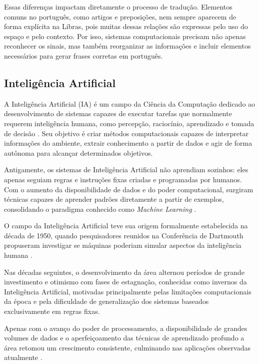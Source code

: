 \documentclass[
    12pt,                %
    openright,           %
    oneside,             %
    a4paper,             %
    english,             %
    brazil               %
]{abntex2}
\begin{document}
Essas diferenças impactam diretamente o processo de tradução. Elementos comuns no português, como artigos e preposições, nem sempre aparecem de forma explícita na Libras, pois muitas dessas relações são expressas pelo uso do espaço e pelo contexto. Por isso, sistemas computacionais precisam não apenas reconhecer os sinais, mas também reorganizar as informações e incluir elementos necessários para gerar frases corretas em português.


\subsection{Inteligência Artificial}

A Inteligência Artificial (IA) é um campo da Ciência da Computação dedicado ao desenvolvimento de sistemas capazes de executar tarefas que normalmente requerem inteligência humana, como percepção, raciocínio, aprendizado e tomada de decisão \cite{russell2021}. Seu objetivo é criar métodos computacionais capazes de interpretar informações do ambiente, extrair conhecimento a partir de dados e agir de forma autônoma para alcançar determinados objetivos.

Antigamente, os sistemas de Inteligência Artificial não aprendiam sozinhos: eles apenas seguiam regras e instruções fixas criadas e programadas por humanos. Com o aumento da disponibilidade de dados e do poder computacional, surgiram técnicas capazes de aprender padrões diretamente a partir de exemplos, consolidando o paradigma conhecido como \textit{Machine Learning} \cite{ibm_ml2026}.

O campo da Inteligência Artificial teve sua origem formalmente estabelecida na década de 1950, quando pesquisadores reunidos na Conferência de Dartmouth propuseram investigar se máquinas poderiam simular aspectos da inteligência humana \cite{russell2021}. 

Nas décadas seguintes, o desenvolvimento da área alternou períodos de grande investimento e otimismo com fases de estagnação, conhecidas como invernos da Inteligência Artificial, motivadas principalmente pelas limitações computacionais da época e pela dificuldade de generalização dos sistemas baseados exclusivamente em regras fixas. 

Apenas com o avanço do poder de processamento, a disponibilidade de grandes volumes de dados e o aperfeiçoamento das técnicas de aprendizado profundo a área retomou um crescimento consistente, culminando nas aplicações observadas atualmente \cite{russell2021}.
\end{document}
